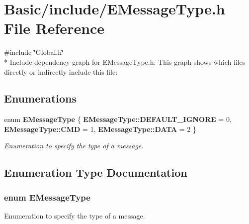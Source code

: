 \section{Basic/include/\-E\-Message\-Type.h File Reference}
\label{EMessageType_8h}
{\ttfamily \#include \char`\"{}Global.\-h\char`\"{}}\\*
Include dependency graph for E\-Message\-Type.\-h\-:
This graph shows which files directly or indirectly include this file\-:
\subsection*{Enumerations}
\begin{DoxyCompactItemize}
\item 
enum {\bf E\-Message\-Type} \{ {\bf E\-Message\-Type\-::\-D\-E\-F\-A\-U\-L\-T\-\_\-\-I\-G\-N\-O\-R\-E} = 0, 
{\bf E\-Message\-Type\-::\-C\-M\-D} = 1, 
{\bf E\-Message\-Type\-::\-D\-A\-T\-A} = 2
 \}
\begin{DoxyCompactList}\small\item\em Enumeration to specify the type of a message. \end{DoxyCompactList}\end{DoxyCompactItemize}


\subsection{Enumeration Type Documentation}
\subsubsection[{E\-Message\-Type}]{\setlength{\rightskip}{0pt plus 5cm}enum {\bf E\-Message\-Type}\hspace{0.3cm}{\ttfamily [strong]}}\label{EMessageType_8h_ad2ca0a3c84404274f8bfaa618869fdf9}


Enumeration to specify the type of a message. 

